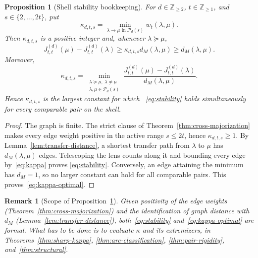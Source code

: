 \documentclass[pdflatex,sn-mathphys-num]{sn-jnl}
\theoremstyle{thmstyleone}
\newtheorem{proposition}[theorem]{Proposition}
\theoremstyle{thmstylethree}
\theoremstyle{thmstyletwo}
\newtheorem*{namedremark}{Remark}
\newcommand{\Z}{\mathbb Z}
\begin{document}
\begin{proposition}[Shell stability bookkeeping]
\label{thm:shell-stability}
For $d\in\Z_{\ge2}$, $t\in\Z_{\ge1}$, and
$s\in\{2,\ldots,2t\}$, put
\begin{equation}
 \kappa_{d,t,s}
 =\min_{\lambda\to\mu\text{ in }\mathcal P_d(s)}
 w_t(\lambda,\mu).                                  \label{eq:kappa}
\end{equation}
Then $\kappa_{d,t,s}$ is a positive integer and, whenever
$\lambda\succeq\mu$,
\begin{equation}
 J_{t,t}^{(d)}(\mu)-J_{t,t}^{(d)}(\lambda)
 \ge \kappa_{d,t,s}d_M(\lambda,\mu)
 \ge d_M(\lambda,\mu).                              \label{eq:stability}
\end{equation}
Moreover,
\begin{equation}
 \kappa_{d,t,s}
 =\min_{\substack{\lambda\succeq\mu,\ \lambda\ne\mu\\
                   \lambda,\mu\in\mathcal P_d(s)}}
 \frac{J_{t,t}^{(d)}(\mu)-J_{t,t}^{(d)}(\lambda)}
      {d_M(\lambda,\mu)}.                            \label{eq:kappa-optimal}
\end{equation}
Hence $\kappa_{d,t,s}$ is the largest constant for which
~\eqref{eq:stability} holds simultaneously for every comparable pair on the
shell.
\end{proposition}

\begin{proof}
The graph is finite.  The strict clause of
Theorem~\ref{thm:cross-majorization} makes every edge weight positive in the
active range $s\le2t$, hence $\kappa_{d,t,s}\ge1$.  By
Lemma~\ref{lem:transfer-distance}, a shortest transfer path
from $\lambda$ to $\mu$ has $d_M(\lambda,\mu)$ edges.  Telescoping the lens
counts along it and bounding every edge by~\eqref{eq:kappa} proves
\eqref{eq:stability}.  Conversely, an edge attaining the minimum has
$d_M=1$, so no larger constant can hold for all comparable pairs.  This
proves~\eqref{eq:kappa-optimal}.
\end{proof}

\begin{namedremark}[Scope of Proposition~\ref{thm:shell-stability}]
Given positivity of the edge weights (Theorem~\ref{thm:cross-majorization})
and the identification of graph distance with $d_M$
(Lemma~\ref{lem:transfer-distance}), both~\eqref{eq:stability}
and~\eqref{eq:kappa-optimal} are formal.  What has to be done is to evaluate
$\kappa$ and its extremizers, in
Theorems~\ref{thm:sharp-kappa}, \ref{thm:arc-classification},
\ref{thm:pair-rigidity}, and~\ref{thm:structural}.
\end{namedremark}
\end{document}
